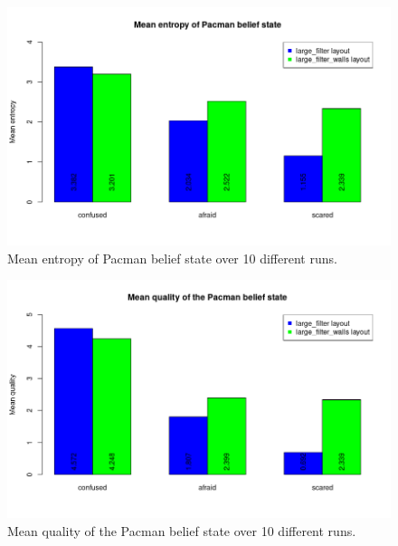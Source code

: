 \documentclass{article}
\begin{document}
\begin{enumerate}[label=\alph*.,leftmargin=*]
\begin{figure}[H]
    \centering
    \includegraphics[scale=0.75]{plots/pacman_belief_state.png} 
    \caption{Mean entropy of Pacman belief state over 10 different runs.}
\end{figure}

\begin{figure}[H]
    \centering
    \includegraphics[scale=0.75]{plots/difference.png} 
    \caption{Mean quality of the Pacman belief state over 10 different runs.}
\end{figure}
    

\end{enumerate}
\end{document}
